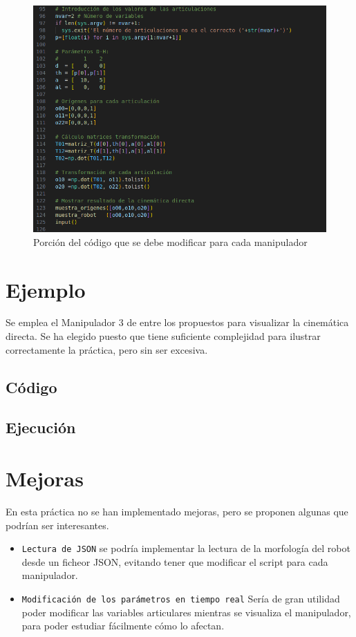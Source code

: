 \begin{figure}[htb]
   \centering
   \includegraphics[width=1\linewidth]{images/cin_dir_1.png}
   \caption{Porción del código que se debe modificar para cada manipulador}
   \label{chapter:intro2}
\end{figure}
\section{Ejemplo}
Se emplea el Manipulador 3 de entre los propuestos para visualizar la cinemática directa. Se ha elegido puesto que tiene suficiente complejidad para ilustrar correctamente la práctica, pero sin ser excesiva.
\subsection{Código}

\subsection{Ejecución}

\section{Mejoras}
En esta práctica no se han implementado mejoras, pero se proponen algunas que podrían ser interesantes.
\begin{itemize}
   \item \texttt{Lectura de JSON} se podría implementar la lectura de la morfología del robot desde un ficheor JSON, evitando tener que modificar el script para cada manipulador.
   \item \texttt{Modificación de los parámetros en tiempo real} Sería de gran utilidad poder modificar las variables articulares mientras se visualiza el manipulador, para poder estudiar fácilmente cómo lo afectan.
\end{itemize}

